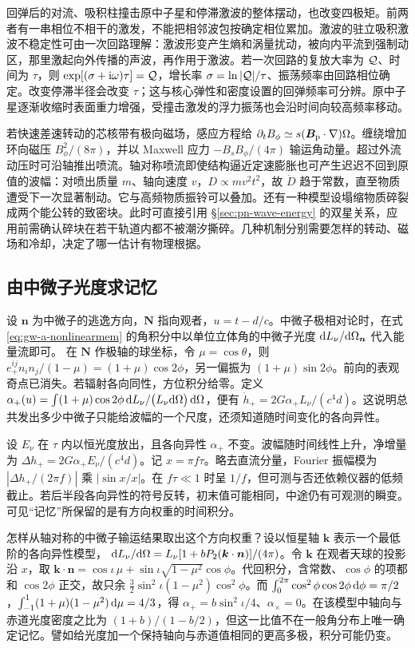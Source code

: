 回弹后的对流、吸积柱撞击原中子星和停滞激波的整体摆动，也改变四极矩。前两者有一串相位不相干的激发，不能把相邻波包按确定相位累加。激波的驻立吸积激波不稳定性可由一次回路理解：激波形变产生熵和涡量扰动，被向内平流到强制动区，那里激起向外传播的声波，再作用于激波。若一次回路的复放大率为 ${\cal Q}$、时间为 $\tau$，则 $\exp[(\sigma+\mathrm i\omega)\tau]={\cal Q}$，增长率 $\sigma=\ln|{\cal Q}|/\tau$、振荡频率由回路相位确定。改变停滞半径会改变 $\tau$；这与核心弹性和密度设置的回弹频率可分辨。原中子星逐渐收缩时表面重力增强，受撞击激发的浮力振荡也会沿时间向较高频率移动。

若快速差速转动的芯核带有极向磁场，感应方程给 $\partial_t B_\phi\simeq s(\bm B_{\rm p}\cdot\nabla)\Omega$。缠绕增加环向磁压 $B_\phi^2/(8\pi)$，并以 Maxwell 应力 $-B_s B_\phi/(4\pi)$ 输运角动量。超过外流动压时可沿轴推出喷流。轴对称喷流即使结构逼近定速膨胀也可产生迟迟不回到原值的波幅：对喷出质量 $m$、轴向速度 $v$，$D\propto m v^2 t^2$，故 $\ddot D$ 趋于常数，直至物质遭受下一次显著制动。它与高频物质振铃可以叠加。还有一种模型设塌缩物质碎裂成两个能公转的致密块。此时可直接引用 \S\ref{sec:pn-wave-energy} 的双星关系，应用前需确认碎块在若干轨道内都不被潮汐撕碎。几种机制分别需要怎样的转动、磁场和冷却，决定了哪一估计有物理根据。

\subsection{由中微子光度求记忆}

设 $\bm n$ 为中微子的逃逸方向，$\bm N$ 指向观者，$u=t-d/c$。中微子极相对论时，在式 \eqref{eq:gw-a-nonlinearmem} 的角积分中以单位立体角的中微子光度 $\dd L_\nu/\dd\Omega_{\bm n}$ 代入能量流即可。
在 $\bm N$ 作极轴的球坐标，令 $\mu=\cos\theta$，则 $e_+^{ij}n_i n_j/(1-\mu)=(1+\mu)\cos 2\phi$，另一偏振为 $(1+\mu)\sin2\phi$。前向的表观奇点已消失。若辐射各向同性，方位积分给零。定义 $\alpha_+(u)=\int(1+\mu)\cos2\phi\,\dd L_\nu/\big(L_\nu\dd\Omega\big)\,\dd\Omega$，便有 $\dot h_+=2G\alpha_+L_\nu/(c^4d)$。这说明总共发出多少中微子只能给波幅的一个尺度，还须知道随时间变化的各向异性。

设 $E_\nu$ 在 $\tau$ 内以恒光度放出，且各向异性 $\alpha_+$ 不变。波幅随时间线性上升，净增量为 $\Delta h_+=2G\alpha_+E_\nu/(c^4d)$。记 $x=\pi f\tau$。略去直流分量，Fourier 振幅模为 $|\Delta h_+/(2\pi f)|$ 乘 $|\sin x/x|$。在 $f\tau\ll1$ 时呈 $1/f$，但可测与否还依赖仪器的低频截止。若后半段各向异性的符号反转，初末值可能相同，中途仍有可观测的瞬变。可见“记忆”所保留的是有方向权重的时间积分。

怎样从轴对称的中微子输运结果取出这个方向权重？设以恒星轴 $\bm k$ 表示一个最低阶的各向异性模型，
$\dd L_\nu/\dd\Omega=L_\nu[1+b P_2(\bm k\cdot\bm n)]/(4\pi)$。令 $\bm k$ 在观者天球的投影沿 $x$，取 $\bm k\cdot\bm n=\cos\iota\,\mu+\sin\iota\sqrt{1-\mu^2}\cos\phi$。代回积分，含常数、$\cos\phi$ 的项都和 $\cos2\phi$ 正交，故只余 $\tfrac32\sin^2\iota(1-\mu^2)\cos^2\phi$。而 $\int_0^{2\pi}\cos^2\phi\cos2\phi\,\dd\phi=\pi/2$，$\int_{-1}^1(1+\mu)(1-\mu^2)\,\dd\mu=4/3$，得 $\alpha_+=b\sin^2\iota/4$、$\alpha_\times=0$。在该模型中轴向与赤道光度密度之比为 $(1+b)/(1-b/2)$，但这一比值不在一般角分布上唯一确定记忆。譬如给光度加一个保持轴向与赤道值相同的更高多极，积分可能仍变。

